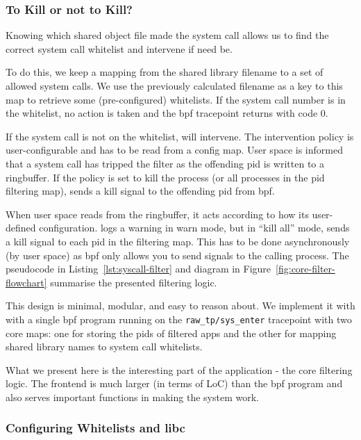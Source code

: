 \subsubsection{To Kill or not to Kill?}

Knowing which shared object file made the system call allows us to find the correct
system call whitelist and intervene if need be.

To do this, we keep a mapping from the shared library filename to a set of allowed
system calls. We use the previously calculated filename as a key to this map to
retrieve some (pre-configured) whitelists. If the system call number is in the
whitelist, no action is taken and the \ac{bpf} tracepoint returns with code 0.

If the system call is not on the whitelist, \af will intervene. The intervention
policy is user-configurable and has to be read from a config map. User space is
informed that a system call has tripped the filter as the offending \ac{pid} is
written to a ringbuffer. If the policy is set to kill the process (or all 
processes in the \ac{pid} filtering map), \af sends a kill signal to the 
offending \ac{pid} from \ac{bpf}. 

When user space reads  from the ringbuffer, it acts according to how its user-defined configuration. \af logs a warning in warn mode, but in ``kill all'' mode, sends a 
kill signal to each \ac{pid} in the filtering map. This has to be
done asynchronously (by user space) as \ac{bpf} only allows you to send signals
to the calling process. The pseudocode in
Listing~\ref{lst:syscall-filter} and diagram in 
Figure~\ref{fig:core-filter-flowchart} summarise the presented filtering logic.

This design is minimal, modular, and easy to reason about. We implement it with
with a single \ac{bpf} program running on the \texttt{raw\_tp/sys\_enter}
tracepoint with two core maps: one for storing the \acp{pid} of filtered apps
and the other for mapping shared library names to system call whitelists.

What we present here is the interesting part of the application
- the core filtering logic. The frontend is much larger (in terms of LoC) than
the \ac{bpf} program and also serves important functions in making the system
work.

\subsubsection{Configuring Whitelists and \ac{libc}}

